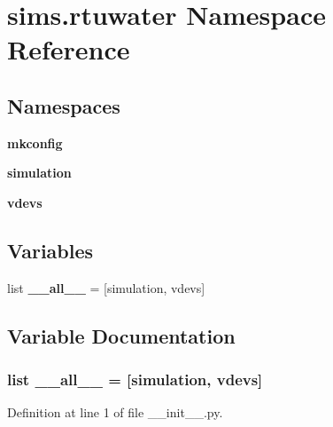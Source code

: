 \section{sims.\+rtuwater Namespace Reference}
\label{namespacesims_1_1rtuwater}
\subsection*{Namespaces}
\begin{DoxyCompactItemize}
\item 
 {\bf mkconfig}
\item 
 {\bf simulation}
\item 
 {\bf vdevs}
\end{DoxyCompactItemize}
\subsection*{Variables}
\begin{DoxyCompactItemize}
\item 
list {\bf \+\_\+\+\_\+all\+\_\+\+\_\+} = [\textquotesingle{}simulation\textquotesingle{}, \textquotesingle{}vdevs\textquotesingle{}]
\end{DoxyCompactItemize}


\subsection{Variable Documentation}
\subsubsection[{\+\_\+\+\_\+all\+\_\+\+\_\+}]{\setlength{\rightskip}{0pt plus 5cm}list \+\_\+\+\_\+all\+\_\+\+\_\+ = [\textquotesingle{}simulation\textquotesingle{}, \textquotesingle{}vdevs\textquotesingle{}]}\label{namespacesims_1_1rtuwater_aa4a022e6ddacd362b83964da5cc5d044}


Definition at line 1 of file \+\_\+\+\_\+init\+\_\+\+\_\+.\+py.

